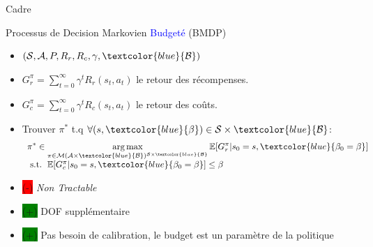 \documentclass[french,handout]{beamer}
\newcommand{\cplus}{\colorbox{green}{(+)} }
\newcommand{\cmoins}{\colorbox{red}{(-)} }
\begin{document}
    \begin{frame}{Cadre}

        \begin{block}{Processus de Decision Markovien \textcolor{blue}{Budgeté} (BMDP)}
            \begin{itemize}
                \item $(\cS, \cA, P, R_r,{R_c}, \gamma,\textcolor{blue}{\cB})$
                \item $G_r^\pi = \sum_{t=0}^\infty \gamma^t R_r(s_t, a_t)$ le retour des récompenses.
                \item  $G_c^\pi = \sum_{t=0}^\infty \gamma^t R_c(s_t, a_t)$ le retour des coûts.
                \item Trouver $\pi^*$ t.q $\forall (s,\textcolor{blue}{\beta})\in\cS\times\textcolor{blue}{\cB}$:
                \begin{equation}
                    \label{eq:bmdp}
                    \begin{array}{lcr}
                        \displaystyle \pi^* \in \argmax_{\pi\in\cM(\cA\times\textcolor{blue}{\cB})^{\cS\times\textcolor{blue}{\cB}}} \expectedvalue[G_r^\pi | s_0=s,\textcolor{blue}{\beta_0=\beta}] \\
                        \text{ s.t. }  \expectedvalue[G_c^\pi | s_0=s,\textcolor{blue}{\beta_0=\beta}] \leq \beta
                    \end{array}
                \end{equation}
            \end{itemize}
        \end{block}


        \begin{block}{}
            \begin{itemize}
                \item \cmoins \textit{Non Tractable}
                \item \cplus DOF supplémentaire
                \item \cplus Pas besoin de calibration, le budget est un paramètre de la politique

            \end{itemize}
        \end{block}

    \end{frame}
\end{document}
